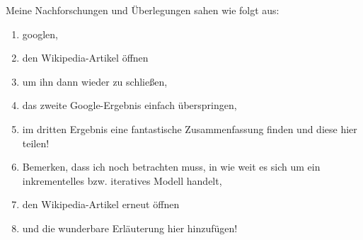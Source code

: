\documentclass{abgabe}
\begin{document}
\begin{questions}
\begin{solution}
        Meine Nachforschungen und Überlegungen sahen wie folgt aus:
        \begin{enumerate}
            \item {} googlen,
            \item den Wikipedia-Artikel öffnen
            \item um ihn dann wieder zu schließen,
            \item das zweite Google-Ergebnis einfach überspringen,
            \item im dritten Ergebnis eine fantastische Zusammenfassung finden und diese hier teilen!
            \item Bemerken, dass ich noch betrachten muss, in wie weit es sich um ein inkrementelles bzw. iteratives Modell handelt,
            \item den Wikipedia-Artikel erneut öffnen
            \item und die wunderbare Erläuterung hier hinzufügen!
        \end{enumerate}
    \end{solution}
\end{questions}
\end{document}
